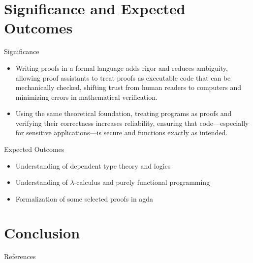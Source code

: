 \documentclass{beamer}
\begin{document}
\section{Significance and Expected Outcomes}
\begin{frame}{Significance}
  \begin{itemize}
    \item Writing proofs in a formal language adds rigor and reduces ambiguity, allowing proof assistants to treat proofs as executable code that can be mechanically checked, shifting trust from human readers to computers and minimizing errors in mathematical verification.

   \item Using the same theoretical foundation, treating programs as proofs and verifying their correctness increases reliability, ensuring that code—especially for sensitive applications—is secure and functions exactly as intended.

  \end{itemize}
\end{frame}
\begin{frame}{Expected Outcomes}
  \begin{itemize}
    \item Understanding of dependent type theory and logics
    \item Understanding of $\lambda$-calculus and purely functional programming
    \item  Formalization of some selected proofs in agda
  \end{itemize}
\end{frame}

\section{Conclusion}
\begin{frame}{References}
       
 
\end{frame}

       
\end{document}
